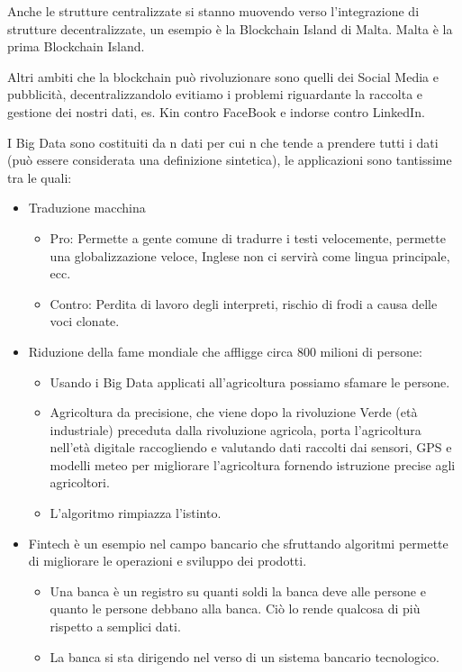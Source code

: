 \documentclass[a4page, 11pt]{article}
\begin{document}
Anche le strutture centralizzate si stanno muovendo verso l'integrazione di strutture decentralizzate, un esempio è la Blockchain Island di Malta. Malta è la prima Blockchain Island.

Altri ambiti che la blockchain può rivoluzionare sono quelli dei Social Media e pubblicità, decentralizzandolo evitiamo i problemi riguardante la raccolta e gestione dei nostri dati, es. Kin contro FaceBook e indorse contro LinkedIn.

I Big Data sono costituiti da n dati per cui n che tende a prendere tutti i dati (può essere considerata una definizione sintetica), le applicazioni sono tantissime tra le quali:
\begin{itemize}[noitemsep]
	\item Traduzione macchina
	\begin{itemize}[noitemsep]
		\item Pro: Permette a gente comune di tradurre i testi velocemente, permette una globalizzazione veloce, Inglese non ci servirà come lingua principale, ecc.
		\item Contro: Perdita di lavoro degli interpreti, rischio di frodi a causa delle voci clonate.
	\end{itemize}
	\item Riduzione della fame mondiale che affligge circa 800 milioni di persone:
	\begin{itemize}[noitemsep]
		\item Usando i Big Data applicati all’agricoltura possiamo sfamare le persone.
		\item Agricoltura da precisione, che viene dopo la rivoluzione Verde (età industriale) preceduta dalla rivoluzione agricola, porta l’agricoltura nell’età digitale raccogliendo e valutando dati raccolti dai sensori, GPS e modelli meteo per migliorare l’agricoltura fornendo istruzione precise agli agricoltori. 
		\item L’algoritmo rimpiazza l’istinto.
	\end{itemize}
	\item Fintech è un esempio nel campo bancario che sfruttando algoritmi permette di migliorare le operazioni e sviluppo dei prodotti.
	\begin{itemize}[noitemsep]
		\item Una banca è un registro su quanti soldi la banca deve alle persone e quanto le persone debbano alla banca. Ciò lo rende qualcosa di più rispetto a semplici dati.
		\item La banca si sta dirigendo nel verso di un sistema bancario tecnologico.
	\end{itemize}
\end{itemize}
\end{document}
